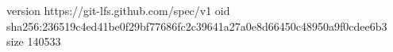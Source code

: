 version https://git-lfs.github.com/spec/v1
oid sha256:236519c4ed41be0f29bf77686fc2c39641a27a0e8d66450c48950a9f0cdee6b3
size 140533
